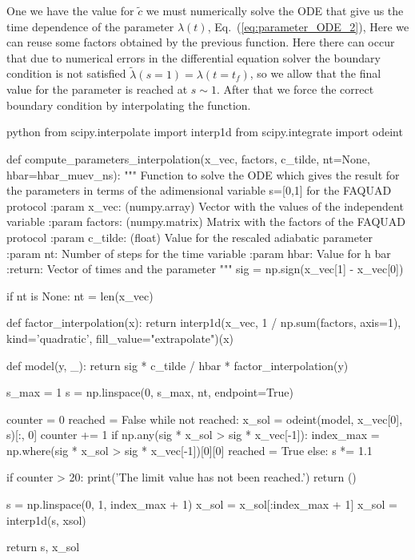 One we have the value for $\tilde{c}$ we must numerically solve the ODE that give us the time dependence of the parameter $\lambda(t)$, Eq.~(\ref{eq:parameter_ODE_2}), Here we can reuse some factors obtained by the previous function. Here there can occur that due to numerical errors in the differential equation solver the boundary condition is not satisfied $\tilde{\lambda}(s=1)=\lambda(t=t_f)$, so we allow that the final value for the parameter is reached at $s\sim 1$. After that we force the correct boundary condition by interpolating the function.
\begin{mintedbox}{python}
from scipy.interpolate import interp1d
from scipy.integrate import odeint
	
def compute_parameters_interpolation(x_vec, factors, c_tilde, nt=None, hbar=hbar_muev_ns):
	"""
	Function to solve the ODE which gives the result for the parameters in terms of the adimensional variable s=[0,1] for the FAQUAD protocol
	:param x_vec: (numpy.array) Vector with the values of the independent variable
	:param factors: (numpy.matrix) Matrix with the factors of the FAQUAD protocol
	:param c_tilde: (float) Value for the rescaled adiabatic parameter
	:param nt: Number of steps for the time variable
	:param hbar: Value for h bar
	:return: Vector of times and the parameter
	"""
	sig = np.sign(x_vec[1] - x_vec[0])

	if nt is None:
		nt = len(x_vec)

	def factor_interpolation(x):
		return interp1d(x_vec, 1 / np.sum(factors, axis=1), kind='quadratic', fill_value="extrapolate")(x)

	def model(y, _):
		return sig * c_tilde / hbar * factor_interpolation(y)

	s_max = 1
	s = np.linspace(0, s_max, nt, endpoint=True)

	counter = 0
	reached = False
	while not reached:
		x_sol = odeint(model, x_vec[0], s)[:, 0]
		counter += 1
		if np.any(sig * x_sol > sig * x_vec[-1]):
			index_max = np.where(sig * x_sol > sig * x_vec[-1])[0][0]
			reached = True
		else:
			s *= 1.1

		if counter > 20:
			print('The limit value has not been reached.')
			return ()

	s = np.linspace(0, 1, index_max + 1)
	x_sol = x_sol[:index_max + 1]
	x_sol = interp1d(s, xsol)

	return s, x_sol
\end{mintedbox}

